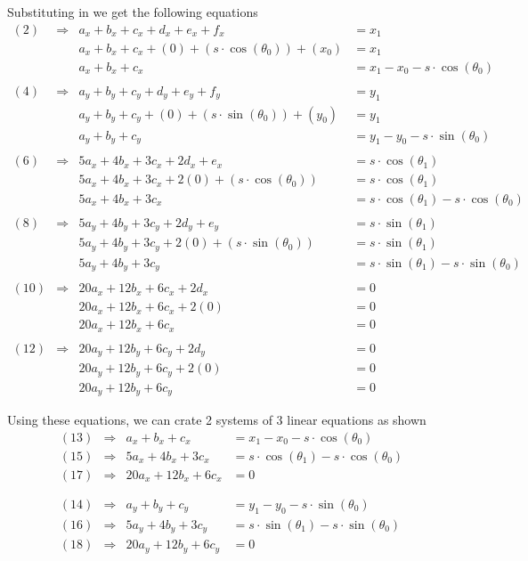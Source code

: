 \documentclass[12pt, letterpaper]{article}
\begin{document}
Substituting in we get the following equations
\begin{align}
(2) &\Rightarrow & a_x + b_x + c_x + d_x + e_x + f_x &= x_1 \nonumber \\
&& a_x + b_x + c_x + (0) + (s \cdot \cos(\theta_0)) + (x_0) &= x_1 \nonumber \\
&& a_x + b_x + c_x &= x_1 - x_0 - s \cdot \cos(\theta_0) \\
\nonumber \\
(4) &\Rightarrow & a_y + b_y + c_y + d_y + e_y + f_y &= y_1 \nonumber \\
&& a_y + b_y + c_y + (0) + (s \cdot \sin(\theta_0)) + (y_0) &= y_1 \nonumber \\
&& a_y + b_y + c_y &= y_1 - y_0 - s \cdot \sin(\theta_0) \\
\nonumber \\
(6) &\Rightarrow & 5a_x + 4b_x + 3c_x + 2d_x + e_x &= s \cdot \cos(\theta_1) \nonumber \\
&& 5a_x + 4b_x + 3c_x + 2(0) + (s \cdot \cos(\theta_0)) &= s \cdot \cos(\theta_1) \nonumber \\
&& 5a_x + 4b_x + 3c_x &= s \cdot \cos(\theta_1) - s \cdot \cos(\theta_0) \\
\nonumber \\
(8) &\Rightarrow & 5a_y + 4b_y + 3c_y + 2d_y + e_y &= s \cdot \sin(\theta_1) \nonumber \\
&& 5a_y + 4b_y + 3c_y + 2(0) + (s \cdot \sin(\theta_0)) &= s \cdot \sin(\theta_1) \nonumber \\
&& 5a_y + 4b_y + 3c_y &= s \cdot \sin(\theta_1) - s \cdot \sin(\theta_0) \\
\nonumber \\
(10) &\Rightarrow & 20a_x + 12b_x + 6c_x + 2d_x &= 0 \nonumber \\
&& 20a_x + 12b_x + 6c_x + 2(0) &= 0 \nonumber \\
&& 20a_x + 12b_x + 6c_x &= 0 \\
\nonumber \\
(12) &\Rightarrow & 20a_y + 12b_y + 6c_y + 2d_y &= 0 \nonumber \\
&& 20a_y + 12b_y + 6c_y + 2(0) &= 0 \nonumber \\
&& 20a_y + 12b_y + 6c_y &= 0 
\end{align}

Using these equations, we can crate 2 systems of 3 linear equations as shown
\begin{align*}
(13) &\Rightarrow & a_x + b_x + c_x &= x_1 - x_0 - s \cdot \cos(\theta_0) \\
(15) &\Rightarrow & 5a_x + 4b_x + 3c_x &= s \cdot \cos(\theta_1) - s \cdot \cos(\theta_0) \\
(17) &\Rightarrow & 20a_x + 12b_x + 6c_x &= 0 \\
\\ \\
(14) &\Rightarrow & a_y + b_y + c_y &= y_1 - y_0 - s \cdot \sin(\theta_0) \\
(16) &\Rightarrow & 5a_y + 4b_y + 3c_y &= s \cdot \sin(\theta_1) - s \cdot \sin(\theta_0) \\
(18) &\Rightarrow & 20a_y + 12b_y + 6c_y &= 0 
\end{align*}
\end{document}
